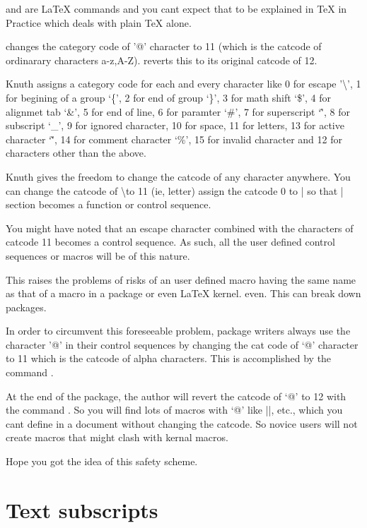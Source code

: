  and  are LaTeX commands and you cant
expect that to be explained in TeX in Practice which deals with
plain TeX alone.



 changes the category code of '@' character to 11 
(which is the catcode of ordinarary characters a-z,A-Z). 
 reverts this to its original catcode of 12.   

Knuth assigns a category code for each and every character like 0 
for escape '\textbackslash', 1 for begining of a group `\{', 2 for end of group 
`\}', 3 for math shift `\$', 4 for alignmet tab `\&', 5 for end of 
line, 6 for paramter `\#', 7 for superscript `\^', 8 for subscript 
`\_', 9 for ignored character, 10 for space, 11 for letters, 13 for 
active character `\~', 14 for comment character `\%', 15 for invalid 
character and 12 for characters other than the above.

Knuth gives the freedom to change the catcode of any character 
anywhere. You can change the catcode of \textbackslash to 11 (ie, letter) assign 
the catcode 0 to | so that | section becomes a function or control 
sequence.

You might have noted that an escape character combined with the
characters of catcode 11 becomes a control sequence. As such, all
the user defined control sequences or macros will be of this nature.

This raises the problems of risks of an user defined macro having
the same name as that of a macro in a package or even LaTeX kernel.  
even. This can break down packages. 

In order to circumvent this foreseeable problem, package writers
always use the character '@' in their control sequences by changing
the cat code of `@' character to 11 which is the catcode of alpha
characters. This is accomplished by the command . 

At the end of the package, the author will revert the catcode of `@'
to 12 with the command . So you will find lots of macros
with `@' like |\@title|, etc., which you cant define in a document
without changing the catcode. So novice users will not create macros
that might clash with kernal macros.

Hope you got the idea of this safety scheme. 


\section{Text subscripts}
%

